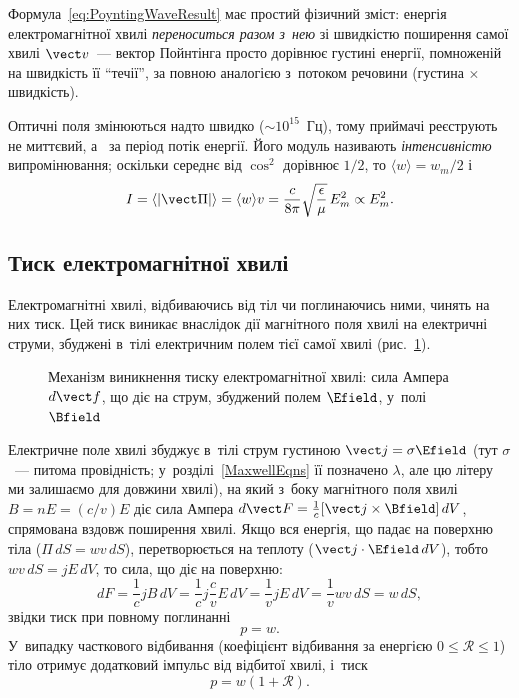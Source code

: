 Формула~\eqref{eq:PoyntingWaveResult} має простий фізичний зміст: енергія електромагнітної хвилі \emph{переноситься разом з~нею} зі
швидкістю поширення самої хвилі $\vect v$~--- вектор Пойнтінга просто дорівнює густині енергії, помноженій на швидкість її \enquote{течії}, за
повною аналогією з~потоком речовини (густина $\times$ швидкість).

Оптичні поля змінюються надто швидко ($\sim10^{15}$~Гц), тому приймачі реєструють не миттєвий, а~ за період потік енергії. Його модуль називають \emph{інтенсивністю} випромінювання; оскільки середнє від $\cos^2$ дорівнює $1/2$, то $\langle w\rangle = w_m/2$ і
\begin{equation}\label{eq:Intensity}
	I = \left\langle|\vect\Pi|\right\rangle = \langle w\rangle v = \frac{c}{8\pi}\sqrt{\frac{\epsilon}{\mu}}\,E_m^2 \propto E_m^2.
\end{equation}


\subsection*{Тиск електромагнітної хвилі}

Електромагнітні хвилі, відбиваючись від тіл чи поглинаючись ними, чинять на них тиск. Цей тиск виникає внаслідок дії магнітного поля хвилі на
електричні струми, збуджені в~тілі електричним полем тієї самої хвилі (рис.~\ref{pic:EMPressure}).

\begin{figure}[h!]\centering
	\caption{Механізм виникнення тиску електромагнітної хвилі: сила Ампера $d\vect f$, що діє на
		струм, збуджений полем $\Efield$, у~полі $\Bfield$\label{pic:EMPressure}}
\end{figure}

Електричне поле хвилі збуджує в~тілі струм густиною $\vect j=\sigma\Efield$ (тут $\sigma$~--- питома провідність; у~розділі~\ref{MaxwellEqns} її позначено $\lambda$, але цю літеру ми залишаємо для довжини хвилі), на який з~боку магнітного поля хвилі $B=nE=(c/v)E$ діє сила Ампера
$d\vect F = \tfrac1c[\vect j\times\Bfield]\,dV$, спрямована вздовж поширення хвилі. Якщо вся енергія, що падає на поверхню тіла ($\Pi\, dS = wv\,
	dS$), перетворюється на теплоту ($\vect j\cdot\Efield\, dV$), тобто $wv\,dS = jE\,dV$, то сила, що діє на поверхню:
\begin{equation}\label{eq:RadiationForce}
	dF = \frac1c jB\,dV = \frac1c j\frac{c}{v}E\,dV = \frac1v jE\,dV = \frac1v wv\,dS = w\,dS,
\end{equation}
звідки тиск при повному поглинанні
\begin{equation}\label{eq:RadiationPressureFull}
	p = w.
\end{equation}
У~випадку часткового відбивання (коефіцієнт відбивання за енергією $0\leqslant\mathcal R\leqslant1$) тіло отримує додатковий імпульс від відбитої хвилі, і~тиск
\begin{equation}\label{eq:RadiationPressurePartial}
		p = w(1+\mathcal R).
\end{equation}

